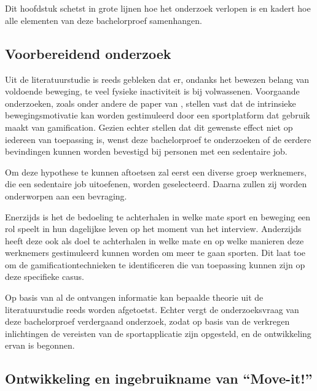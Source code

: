 
\chapter{}%
\label{ch:methodologie}

Dit hoofdstuk schetst in grote lijnen hoe het onderzoek verlopen is en kadert hoe alle elementen van deze bachelorproef samenhangen.

\section{Voorbereidend onderzoek}
Uit de literatuurstudie is reeds gebleken dat er, ondanks het bewezen belang van voldoende beweging, te veel fysieke inactiviteit is bij volwassenen. Voorgaande onderzoeken, zoals onder andere de paper van \textcite{Kari2016}, stellen vast dat de intrinsieke bewegingsmotivatie kan worden gestimuleerd door een sportplatform dat gebruik maakt van gamification. Gezien \textcite{Hamari2013} echter stellen dat dit gewenste effect niet op iedereen van toepassing is, wenst deze bachelorproef te onderzoeken of de eerdere bevindingen kunnen worden bevestigd bij personen met een sedentaire job.

Om deze hypothese te kunnen aftoetsen zal eerst een diverse groep werknemers, die een sedentaire job uitoefenen, worden geselecteerd. Daarna zullen zij worden onderworpen aan een bevraging.

Enerzijds is het de bedoeling te achterhalen in welke mate sport en beweging een rol speelt in hun dagelijkse leven op het moment van het interview. Anderzijds heeft deze ook als doel te achterhalen in welke mate en op welke manieren deze werknemers gestimuleerd kunnen worden om meer te gaan sporten. Dit laat toe om de gamificationtechnieken te identificeren die van toepassing kunnen zijn op deze specifieke casus.

Op basis van al de ontvangen informatie kan bepaalde theorie uit de literatuurstudie reeds worden afgetoetst. Echter vergt de onderzoeksvraag van deze bachelorproef verdergaand onderzoek, zodat op basis van de verkregen inlichtingen de vereisten van de sportapplicatie zijn opgesteld, en de ontwikkeling ervan is begonnen.

\section{Ontwikkeling en ingebruikname van ``Move-it!''}

